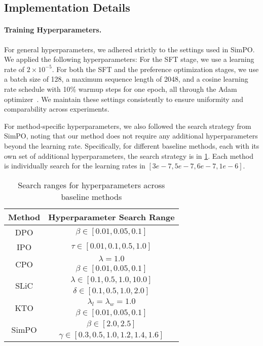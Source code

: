 \subsection{Implementation Details}

\paragraph{Training Hyperparameters.}
For general hyperparameters, we adhered strictly to the settings used in SimPO. 
We applied the following hyperparameters: For the SFT stage, we use a learning rate of $2 \times 10^{-5}$. For both the SFT and the preference optimization stages, we use a batch size of 128, a maximum sequence length of 2048, and a cosine learning rate schedule with 10\% warmup steps for one epoch, all through the Adam optimizer~\citep{kingma2014adam}.
We maintain these settings consistently to ensure uniformity and comparability across experiments.

For method-specific hyperparameters, we also followed the search strategy from SimPO, noting that our method does not require any additional hyperparameters beyond the learning rate. Specifically, for different baseline methods, each with its own set of additional hyperparameters, the search strategy is in \cref{table_baseline_hyper}. 
Each method is individually search for the learning rates in $[3e-7, 5e-7, 6e-7, 1e-6]$.  

\begin{table}[h]
\small
\centering
\caption{Search ranges for hyperparameters across baseline methods}
\begin{tabular}{cc}
\toprule
\textbf{Method} & \textbf{Hyperparameter Search Range} \\
\midrule
DPO & $\beta \in [0.01, 0.05, 0.1]$ \\
\midrule
IPO & $\tau \in [0.01, 0.1, 0.5, 1.0]$ \\
\midrule
\multirow{2}{*}{CPO} 
& $\lambda = 1.0$ \\
& $\beta \in [0.01, 0.05, 0.1]$ \\
\midrule
\multirow{2}{*}{SLiC} 
& $\lambda \in [0.1, 0.5, 1.0, 10.0]$ \\
& $\delta \in [0.1, 0.5, 1.0, 2.0]$ \\
\midrule
\multirow{2}{*}{KTO} 
& $\lambda_l = \lambda_w = 1.0$ \\
& $\beta \in [0.01, 0.05, 0.1]$ \\
\midrule
\multirow{2}{*}{SimPO} 
& $\beta \in [2.0, 2.5]$ \\
& $\gamma \in [0.3, 0.5, 1.0, 1.2, 1.4, 1.6]$ \\
\bottomrule
\end{tabular}
\label{table_baseline_hyper}
\end{table}


